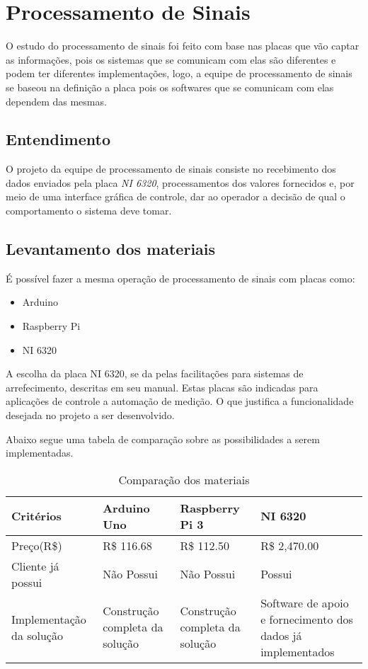 \section{Processamento de Sinais}

O estudo do processamento de sinais foi feito com base nas placas que vão captar as informações, pois os sistemas que se comunicam com elas são diferentes e podem ter diferentes implementações, logo, a equipe de processamento de sinais se baseou na definição a placa
pois os softwares que se comunicam com elas dependem das mesmas.

\subsection{Entendimento}

O projeto da equipe de processamento de sinais consiste no recebimento dos dados enviados pela placa \textit{NI 6320}, processamentos dos valores fornecidos e, por meio de uma interface gráfica de controle, dar ao operador a decisão de qual o comportamento o sistema deve tomar.

\subsection{Levantamento dos materiais}

É possível fazer a mesma operação de processamento de sinais com placas como:
\begin{itemize}
    \item Arduino
    \item Raspberry Pi
    \item NI 6320
    
\end{itemize}

A escolha da placa NI 6320, se da pelas facilitações para sistemas de arrefecimento, descritas em seu manual. Estas placas são indicadas para aplicações de controle a automação de medição. O que justifica a funcionalidade desejada no projeto a ser desenvolvido.

Abaixo segue uma tabela de comparação sobre as possibilidades a serem implementadas.

    \begin{table}[htb]
        \centering
        \begin{tabular}{|p{3cm}|p{3cm}|p{3cm}|p{3cm}|}
        \hline
        Critérios & Arduino Uno & Raspberry Pi 3 & NI 6320 \\ \hline
        Preço(R\$) & R\$ 116.68 & R\$ 112.50 & R\$ 2,470.00 \\ \hline
        Cliente já possui & Não Possui & Não Possui & Possui \\ \hline
        Implementação da solução & Construção completa da solução & Construção completa da solução & Software de apoio e fornecimento dos dados já implementados\\ \hline
        \end{tabular}
        \caption{Comparação dos materiais}
        \end{table}


